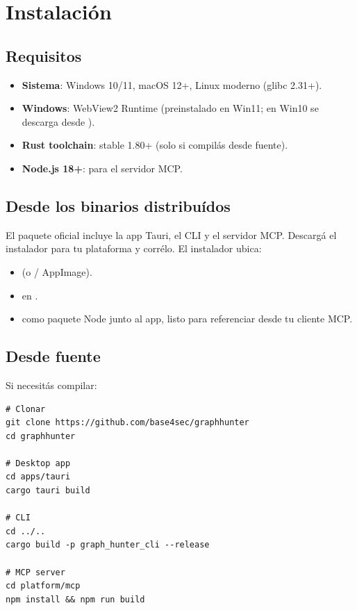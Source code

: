 \chapter{Instalación}
\label{sec:man-install}

\section{Requisitos}

\begin{itemize}
    \item \textbf{Sistema}: Windows 10/11, macOS 12+, Linux
    moderno (glibc 2.31+).
    \item \textbf{Windows}: WebView2 Runtime (preinstalado en Win11;
    en Win10 se descarga desde
    ).
    \item \textbf{Rust toolchain}: stable 1.80+ (solo si compilás
    desde fuente).
    \item \textbf{Node.js 18+}: para el servidor MCP.
\end{itemize}

\section{Desde los binarios distribuídos}

El paquete oficial incluye la app Tauri, el CLI y el servidor MCP.
Descargá el instalador para tu plataforma y corrélo. El instalador
ubica:

\begin{itemize}
    \item {} (o  / AppImage).
    \item {} en .
    \item {} como paquete Node junto al
    app, listo para referenciar desde tu cliente MCP.
\end{itemize}

\section{Desde fuente}

Si necesitás compilar:

\begin{lstlisting}[basicstyle=\ttfamily\small]
# Clonar
git clone https://github.com/base4sec/graphhunter
cd graphhunter

# Desktop app
cd apps/tauri
cargo tauri build

# CLI
cd ../..
cargo build -p graph_hunter_cli --release

# MCP server
cd platform/mcp
npm install && npm run build
\end{lstlisting}

